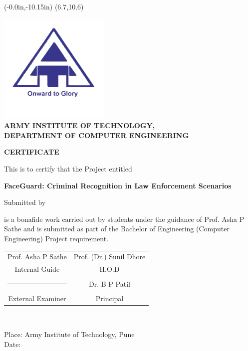 \thisfancyput(-0.0in,-10.15in){
	\setlength{\unitlength}{1in}
	\framebox(6.7,10.6)
}
\setlength{\parindent}{0mm}
\begin{center}
	\includegraphics[scale=0.75]{components/images/logo.png} \\[0.5cm]
	
	{
		\bfseries \large
		ARMY INSTITUTE OF TECHNOLOGY, \\
		DEPARTMENT OF COMPUTER ENGINEERING
		\vspace*{\baselineskip}
	}

	{
		\bfseries \Large
		CERTIFICATE
		\vspace*{\baselineskip}
	}

	This is to certify that the Project entitled

	\vspace*{\baselineskip}

	{
		\bfseries \Large
		FaceGuard: Criminal Recognition in Law Enforcement Scenarios
		\vspace*{\baselineskip}
	}

	Submitted by
	
	\nametable
\end{center}

is a bonafide work carried out by students under the guidance of Prof. Asha P Sathe and is submitted as part of the Bachelor of Engineering (Computer Engineering) Project requirement.

\vspace*{3 \baselineskip}

{
	\bgroup
	\def\arraystretch{0.7}
	\begin{table}[h!]
		\centering
		\begin{tabular}{ c c }
		Prof. Asha P Sathe & \hspace{40 mm} Prof. (Dr.) Sunil Dhore \\
		Internal Guide & \hspace{40 mm} H.O.D \\[1.5cm]
		\vspace{0.1cm} \rule{24ex}{0.15mm} & \hspace{40 mm} Dr. B P Patil \\
		External Examiner &\hspace{40 mm}Principal\\
		\end{tabular}\\[0.5cm]
	\end{table}
}

Place: Army Institute of Technology, Pune \\
Date: 

\pagebreak
